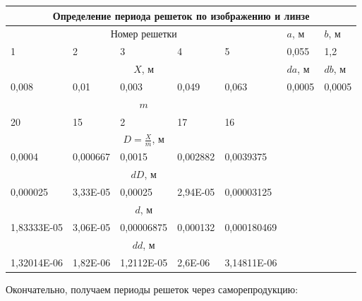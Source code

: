 \documentclass[a4paper,12pt]{article}
\begin{document}
\begin{table}[h!]
	\begin{tabular}{|c|l|l|l|l|ll}
		\hline
		\multicolumn{7}{|c|}{Определение   периода решеток по изображению и линзе}                                                                     \\ \hline
		\multicolumn{5}{|c|}{Номер решетки}                                                & \multicolumn{1}{l|}{$a$, м}   & \multicolumn{1}{l|}{$b$, м}   \\ \hline
		\multicolumn{1}{|l|}{1}           & 2        & 3          & 4        & 5           & \multicolumn{1}{l|}{0,055}  & \multicolumn{1}{l|}{1,2}    \\ \hline
		\multicolumn{5}{|c|}{$X$, м}                                                         & \multicolumn{1}{l|}{$da$, м}  & \multicolumn{1}{l|}{$db$, м}  \\ \hline
		\multicolumn{1}{|l|}{0,008}       & 0,01     & 0,003      & 0,049    & 0,063       & \multicolumn{1}{l|}{0,0005} & \multicolumn{1}{l|}{0,0005} \\ \hline
		\multicolumn{5}{|c|}{$m$}                                                            &                             &                             \\ \cline{1-5}
		\multicolumn{1}{|l|}{20}          & 15       & 2          & 17       & 16          &                             &                             \\ \cline{1-5}
		\multicolumn{5}{|c|}{$D = \frac{X}{m}$, м}                                                   &                             &                             \\ \cline{1-5}
		\multicolumn{1}{|l|}{0,0004}      & 0,000667 & 0,0015     & 0,002882 & 0,0039375   &                             &                             \\ \cline{1-5}
		\multicolumn{5}{|c|}{$dD$, м}                                                        &                             &                             \\ \cline{1-5}
		\multicolumn{1}{|l|}{0,000025}    & 3,33E-05 & 0,00025    & 2,94E-05 & 0,00003125  &                             &                             \\ \cline{1-5}
		\multicolumn{5}{|c|}{$d$, м}                                                         &                             &                             \\ \cline{1-5}
		\multicolumn{1}{|l|}{1,83333E-05} & 3,06E-05 & 0,00006875 & 0,000132 & 0,000180469 &                             &                             \\ \cline{1-5}
		\multicolumn{5}{|c|}{$dd$, м}                                                        &                             &                             \\ \cline{1-5}
		\multicolumn{1}{|l|}{1,32014E-06} & 1,82E-06 & 1,2112E-05 & 2,6E-06  & 3,14811E-06 &                             &                             \\ \cline{1-5}
	\end{tabular}
\end{table}
\newpage
Окончательно, получаем периоды решеток через саморепродукцию:
\end{document}
